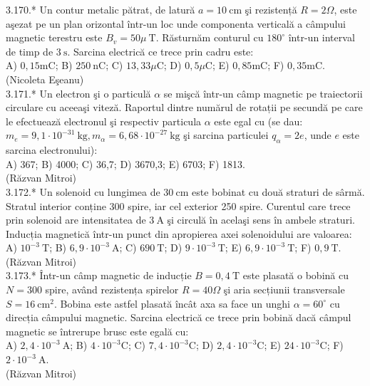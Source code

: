 \documentclass[10pt]{article}
\begin{document}
3.170.* Un contur metalic pătrat, de latură $a=10 \mathrm{~cm}$ şi rezistență $R=2 \Omega$, este aşezat pe un plan orizontal într-un loc unde componenta verticală a câmpului magnetic terestru este $B_{v}=50 \mu \mathrm{~T}$. Răsturnăm conturul cu $180^{\circ}$ într-un interval de timp de $3 \mathrm{~s}$. Sarcina electrică ce trece prin cadru este:\\ A) $0,15 \mathrm{mC}$; B) $250 \mathrm{~nC}$; C) $13,33 \mu \mathrm{C}$; D) $0,5 \mu \mathrm{C}$; E) $0,85 \mathrm{mC}$; F) $0,35 \mathrm{mC}$.\\ (Nicoleta Eşeanu)\\

3.171.* Un electron şi o particulă $\alpha$ se mişcă într-un câmp magnetic pe traiectorii circulare cu aceeaşi viteză. Raportul dintre numărul de rotații pe secundă pe care le efectuează electronul şi respectiv particula $\alpha$ este egal cu (se dau: $m_{e}=9,1 \cdot 10^{-31} \mathrm{~kg}, m_{\alpha}=6,68 \cdot 10^{-27} \mathrm{~kg}$ şi sarcina particulei $q_{\alpha}=2 e$, unde $e$ este sarcina electronului):\\ A) 367; B) 4000; C) 36,7; D) 3670,3; E) 6703; F) 1813.\\ (Răzvan Mitroi)\\

3.172.* Un solenoid cu lungimea de $30 \mathrm{~cm}$ este bobinat cu două straturi de sârmă. Stratul interior conține 300 spire, iar cel exterior 250 spire. Curentul care trece prin solenoid are intensitatea de $3 \mathrm{~A}$ şi circulă în acelaşi sens în ambele straturi. Inducția magnetică într-un punct din apropierea axei solenoidului are valoarea:\\ A) $10^{-3} \mathrm{~T}$; B) $6,9 \cdot 10^{-3} \mathrm{~A}$; C) $690 \mathrm{~T}$; D) $9 \cdot 10^{-3} \mathrm{~T}$; E) $\left.6,9 \cdot 10^{-3} \mathrm{~T}$; F) $0,9 \mathrm{~T}$.\\ (Răzvan Mitroi)\\

3.173.* Într-un câmp magnetic de inducție $B=0,4 \mathrm{~T}$ este plasată o bobină cu $N=300$ spire, având rezistența spirelor $R=40 \Omega$ şi aria secțiunii transversale $S=16 \mathrm{~cm}^{2}$. Bobina este astfel plasată încât axa sa face un unghi $\alpha=60^{\circ}$ cu direcția câmpului magnetic. Sarcina electrică ce trece prin bobină dacă câmpul magnetic se întrerupe brusc este egală cu:\\ A) $2,4 \cdot 10^{-3} \mathrm{~A}$; B) $4 \cdot 10^{-3} \mathrm{C}$; C) $7,4 \cdot 10^{-3} \mathrm{C}$; D) $2,4 \cdot 10^{-3} \mathrm{C}$; E) $24 \cdot 10^{-3} \mathrm{C}$; F) $2 \cdot 10^{-3} \mathrm{~A}$.\\ (Răzvan Mitroi)\\
\end{document}
